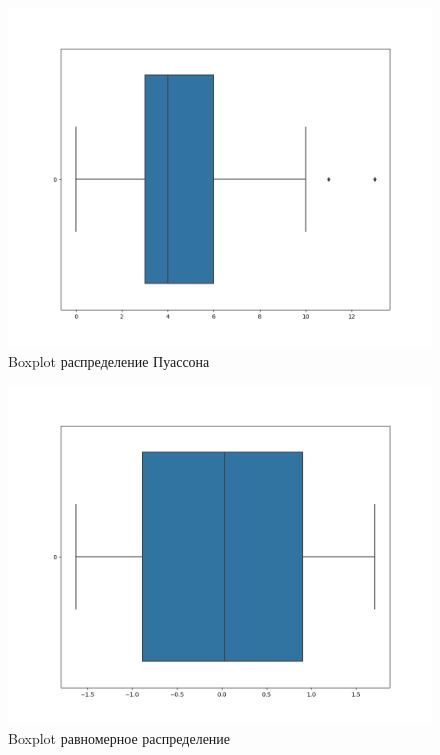 \documentclass[a4]{article}
\begin{document}
\begin{center}
\begin{figure}[H]
\caption{Boxplot распределение Пуассона }
\includegraphics[width=\textwidth]{boxplot_N=100_poisson.png} 
\end{figure}

\begin{figure}[H]
 \caption{Boxplot равномерное распределение }
\includegraphics[width=\textwidth]{boxplot_N=100_uniform.png}
\end{figure}

\begin{table}[H]
    

\end{table}
\end{center}
\end{document}
